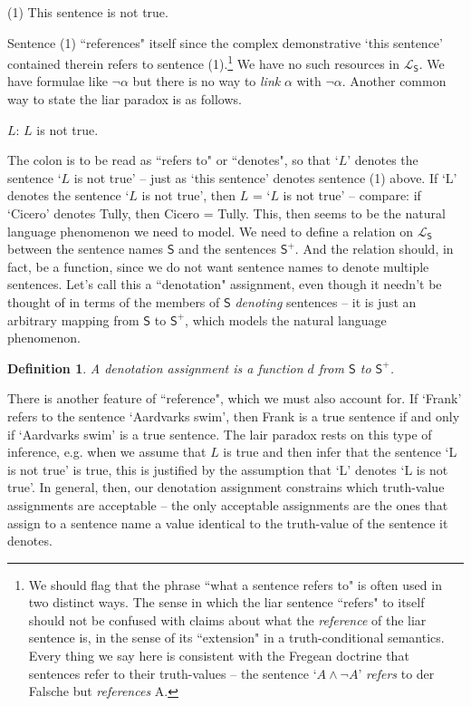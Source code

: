 \documentclass[12pt]{article}
\newtheorem{defn}{Definition}
\theoremstyle{remark}
\newcommand{\fancy}[1]{\mathcal{#1}}
\def\S{\textsf{S}}
\def\L{\fancy{L}}
\begin{document}
\begin{center}
(1) This sentence is not true.\\
\end{center}

Sentence (1) ``references" itself since the complex demonstrative `this sentence' contained therein refers to sentence (1).\footnote{We should flag that the phrase ``what a sentence refers to" is often used in two distinct ways. The sense in which the liar sentence ``refers" to itself should not be confused with claims about what the \textit{reference} of the liar sentence is, in the sense of its ``extension" in a truth-conditional semantics. Every thing we say here is consistent with the Fregean doctrine that sentences refer to their truth-values -- the sentence `$A \wedge \neg A$' \textit{refers} to der Falsche but \textit{references} A.}  We have no such resources in $\L_\S$. We have formulae like $\neg\alpha$ but there is no way to \textit{link} $\alpha$ with $\neg\alpha$. Another common way to state the liar paradox is as follows.

\begin{center}
 $L$: $L$ is not true.\\
 \end{center}
 The colon is to be read as ``refers to" or ``denotes", so that `$L$' denotes the sentence `$L$ is not true' -- just as `this sentence' denotes sentence (1) above. If `L' denotes the sentence `$L$ is not true', then $L$ = `$L$ is not true' -- compare: if `Cicero' denotes Tully, then Cicero = Tully. This, then seems to be the natural language phenomenon we need to model. We need to define a relation on $\L_\S$ between the sentence names $\S$ and the sentences $\S^{+}$. And the relation should, in fact, be a function, since we do not want sentence names to denote multiple sentences. Let's call this a ``denotation" assignment, even though it needn't be thought of in terms of the members of $\S$ \textit{denoting} sentences -- it is just an arbitrary mapping from $\S$ to $\S^{+}$, which models the natural language phenomenon.

\begin{defn}
 A denotation assignment is a function $d$ from $\S$ to $\S^+$. 
\end{defn}

There is another feature of ``reference", which we must also account for. If `Frank' refers to the sentence `Aardvarks swim', then Frank is a true sentence if and only if `Aardvarks swim' is a true sentence. The lair paradox rests on this type of inference, e.g. when we assume that $L$ is true and then infer that the sentence `L is not true' is true, this is justified by the assumption that  `L' denotes `L is not true'. In general, then, our denotation assignment constrains which truth-value assignments are acceptable -- the only acceptable assignments are the ones that assign to a sentence name a value identical to the truth-value of the sentence it denotes.
\end{document}
